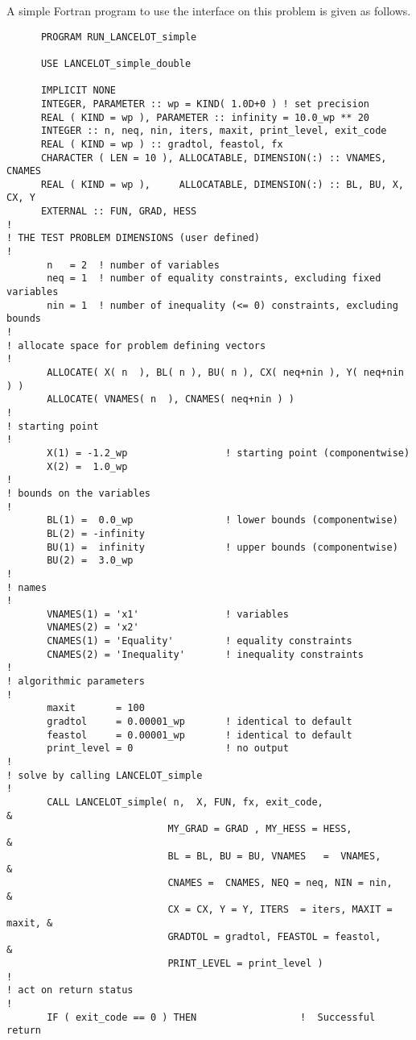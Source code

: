 \documentclass{galahad}
\begin{document}
\noindent
A simple Fortran program to use the interface on this problem is given as
follows.

\def\baselinestretch{0.8}{\tt \begin{verbatim}
      PROGRAM RUN_LANCELOT_simple

      USE LANCELOT_simple_double

      IMPLICIT NONE
      INTEGER, PARAMETER :: wp = KIND( 1.0D+0 ) ! set precision
      REAL ( KIND = wp ), PARAMETER :: infinity = 10.0_wp ** 20
      INTEGER :: n, neq, nin, iters, maxit, print_level, exit_code
      REAL ( KIND = wp ) :: gradtol, feastol, fx
      CHARACTER ( LEN = 10 ), ALLOCATABLE, DIMENSION(:) :: VNAMES, CNAMES
      REAL ( KIND = wp ),     ALLOCATABLE, DIMENSION(:) :: BL, BU, X, CX, Y
      EXTERNAL :: FUN, GRAD, HESS
!
! THE TEST PROBLEM DIMENSIONS (user defined)
!
       n   = 2  ! number of variables
       neq = 1  ! number of equality constraints, excluding fixed variables
       nin = 1  ! number of inequality (<= 0) constraints, excluding bounds
!
! allocate space for problem defining vectors
!
       ALLOCATE( X( n  ), BL( n ), BU( n ), CX( neq+nin ), Y( neq+nin ) )
       ALLOCATE( VNAMES( n  ), CNAMES( neq+nin ) )
!
! starting point
!
       X(1) = -1.2_wp                 ! starting point (componentwise)
       X(2) =  1.0_wp
!
! bounds on the variables
!
       BL(1) =  0.0_wp                ! lower bounds (componentwise)
       BL(2) = -infinity
       BU(1) =  infinity              ! upper bounds (componentwise)
       BU(2) =  3.0_wp
!
! names
!
       VNAMES(1) = 'x1'               ! variables
       VNAMES(2) = 'x2'
       CNAMES(1) = 'Equality'         ! equality constraints
       CNAMES(2) = 'Inequality'       ! inequality constraints
!
! algorithmic parameters
!
       maxit       = 100
       gradtol     = 0.00001_wp       ! identical to default
       feastol     = 0.00001_wp       ! identical to default
       print_level = 0                ! no output
!
! solve by calling LANCELOT_simple
!
       CALL LANCELOT_simple( n,  X, FUN, fx, exit_code,                    &
                            MY_GRAD = GRAD , MY_HESS = HESS,               &
                            BL = BL, BU = BU, VNAMES   =  VNAMES,          &
                            CNAMES =  CNAMES, NEQ = neq, NIN = nin,        &
                            CX = CX, Y = Y, ITERS  = iters, MAXIT = maxit, &
                            GRADTOL = gradtol, FEASTOL = feastol,          &
                            PRINT_LEVEL = print_level )
!
! act on return status
!
       IF ( exit_code == 0 ) THEN                  !  Successful return

\end{verbatim}}
\end{document}
